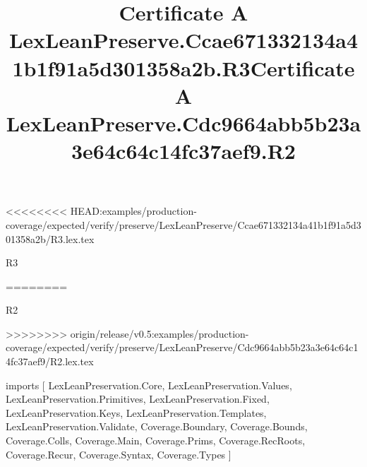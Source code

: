 <<<<<<<< HEAD:examples/production-coverage/expected/verify/preserve/LexLeanPreserve/Ccae671332134a41b1f91a5d301358a2b/R3.lex.tex
\begin{lexlean}{R3}
\title{Certificate A LexLeanPreserve.Ccae671332134a41b1f91a5d301358a2b.R3}
========
\begin{lexlean}{R2}
\title{Certificate A LexLeanPreserve.Cdc9664abb5b23a3e64c64c14fc37aef9.R2}
>>>>>>>> origin/release/v0.5:examples/production-coverage/expected/verify/preserve/LexLeanPreserve/Cdc9664abb5b23a3e64c64c14fc37aef9/R2.lex.tex
\begin{coremodule}
imports [
  LexLeanPreservation.Core,
  LexLeanPreservation.Values,
  LexLeanPreservation.Primitives,
  LexLeanPreservation.Fixed,
  LexLeanPreservation.Keys,
  LexLeanPreservation.Templates,
  LexLeanPreservation.Validate,
  Coverage.Boundary,
  Coverage.Bounds,
  Coverage.Colls,
  Coverage.Main,
  Coverage.Prims,
  Coverage.RecRoots,
  Coverage.Recur,
  Coverage.Syntax,
  Coverage.Types
]


\end{coremodule}
\end{lexlean}
\end{lexlean}

